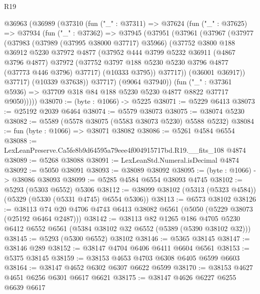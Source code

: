 \begin{lexlean}{R19}
\begin{coremodule}
  @36963
    (@36989
      (@37310
        (fun ("_" : @37311) =>
        @37624
          (fun ("_" : @37625) =>
          @37934
            (fun ("_" : @37362) =>
            @37945
              (@37951
                (@37961
                  (@37967
                    (@37977
                      (@37983
                        (@37989 (@37995 @38000 @37717) @35966)
                        (@37752
                          @3800
                          @188
                          @36912
                          @5230
                          @37972
                          @4877
                          (@37952
                            @444
                            @3799
                            @5232
                            @36911
                            (@4867 @3796 @4877)
                            @37972
                            (@37752 @3797 @188 @5230 @5230 @3796 @4877 (@37773 @446 @3796) @37717)
                            (@10333 @3795))
                          @37717))
                      (@36001 @36917))
                    @37717)
                  (@10339 @37638))
                @37717)
              (@9064 @37940))
            (fun ("_" : @37361 @5936) =>
            @37709 @318 @84 @188 @5230 @5230 @4877 @8822 @37717 @9050)))))
@38070 := (byte : @1066) -> @5225
@38071 := @5229 @6413
@38073 := @25192 @2039 @6464
@38074 := @5579 @38073
@38075 := @38074 @5230
@38082 := @5589 (@5578 @38075 (@5583 @38073 @5230) @5588 @5232)
@38084 := fun (byte : @1066) => @38071 @38082
@38086 := @5261 @4584 @6554
@38088 := LexLeanPreserve.Ca5fe8b9d64595a79eee4f004915717bd.R19.__fits_108 @4874
@38089 := @5268 @38088
@38091 := LexLeanStd.Numeral.isDecimal @4874
@38092 := @5050 @38091
@38093 := @38089 @38092
@38095 := (byte : @1066) -> @38086 @38093
@38099 := @5285 @4584 @6554 @38093 @4745
@38102 := @5293 (@5303 @6552) @5306
@38112 := @38099 @38102 (@5313 (@5323 @4584)) (@5329 (@5330 (@5331 @4745) @6554 @5306))
@38113 := @6573 @38102
@38126 := @38113 @74 @20 @4706 @4743 @6413 @38082 @6561 (@5050 (@5229 @38073 (@25192 @6464 @2487)))
@38142 := @38113
    @82
    @1265
    @186
    @4705
    @5230
    @6412
    @6552
    @6561
    (@5384 @38102 @32 @6552 (@5389 (@5390 @38102 @32)))
@38145 := @5293 (@5300 @6552) @38102
@38146 := @5365 @38145
@38147 := @38146 @289
@38152 := @38147 @4704 @6406 @6411 @6604 @6561
@38153 := @5375 @38145
@38159 := @38153 @4653 @4703 @6308 @6405 @6599 @6603
@38164 := @38147 @4652 @6302 @6307 @6622 @6599
@38170 := @38153 @4627 @4651 @6256 @6301 @6617 @6621
@38175 := @38147 @4626 @6227 @6255 @6639 @6617

\end{coremodule}
\end{lexlean}
